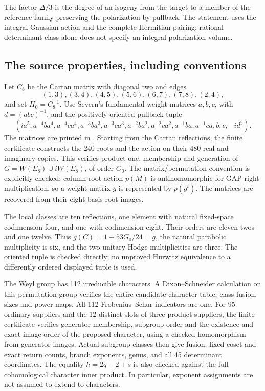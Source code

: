 \documentclass[11pt]{article}
\theoremstyle{definition}
\theoremstyle{remark}
\begin{document}
The factor $\Delta/3$ is the degree of an isogeny from the target
to a member of the reference family preserving the polarization by
pullback.  The statement uses the integral Gaussian action and the
complete Hermitian pairing; rational determinant class alone does
not specify an integral polarization volume.

\subsection{The source properties, including conventions}
\label{subsec:gaussian-discriminant-source}

Let $C_8$ be the Cartan matrix with diagonal two and edges
\[
 (1,3),(3,4),(4,5),(5,6),(6,7),(7,8),(2,4),
\]
and set $H_0=C_8^{-1}$.
Use Severn's fundamental-weight matrices $a,b,c$, with
$d=(abc)^{-1}$, and the positively oriented pullback tuple
\begin{equation}\label{eq:gaussian-discriminant-tuple}
 (ia^5,a^{-4}ba^4,a^{-4}ca^4,a^{-3}ba^3,a^{-3}ca^3,
 a^{-2}ba^2,a^{-2}ca^2,a^{-1}ba,a^{-1}ca,b,c,-id^5).
\end{equation}
The matrices are printed in \cite[Appendix~A]{SevernGaussian}.
Starting from the Cartan reflections, the finite certificate constructs the
240 roots and the action on their 480 real and imaginary copies.
This verifies product one, membership and generation of
$G=W(E_8)\cup iW(E_8)$, of order $G_0$.
The matrix/permutation convention is explicitly checked:
column-root action $p(M)$ is antihomomorphic for GAP right
multiplication, so a weight matrix $g$ is represented by $p(g^t)$.
The matrices are recovered from their eight basis-root images.

The local classes are ten reflections, one element with natural
fixed-space codimension four, and one with codimension eight.
Their orders are eleven twos and one twelve.  Thus
$g(C)=1+53G_0/24=g$, the natural parabolic multiplicity is six,
and the two unitary Hodge multiplicities are three.
The oriented tuple is checked directly; no unproved Hurwitz equivalence
to a differently ordered displayed tuple is used.

The Weyl group has 112 irreducible characters.  A
Dixon--Schneider calculation on this permutation group verifies the
entire candidate character table, class fusion, sizes and power maps.
All 112 Frobenius--Schur indicators are one.
For 95 ordinary suppliers and the 12 distinct slots of three product
suppliers, the finite certificate verifies generator membership, subgroup order
and the existence and exact image order of the proposed character,
using a checked homomorphism from generator images.  Actual subgroup
classes then give fusion, fixed-coset and exact return counts, branch
exponents, genus, and all 45 determinant coordinates.
The equality $h=2q-2+s$ is also checked against the full cohomological
character inner product.  In particular, exponent assignments are not
assumed to extend to characters.
\end{document}
